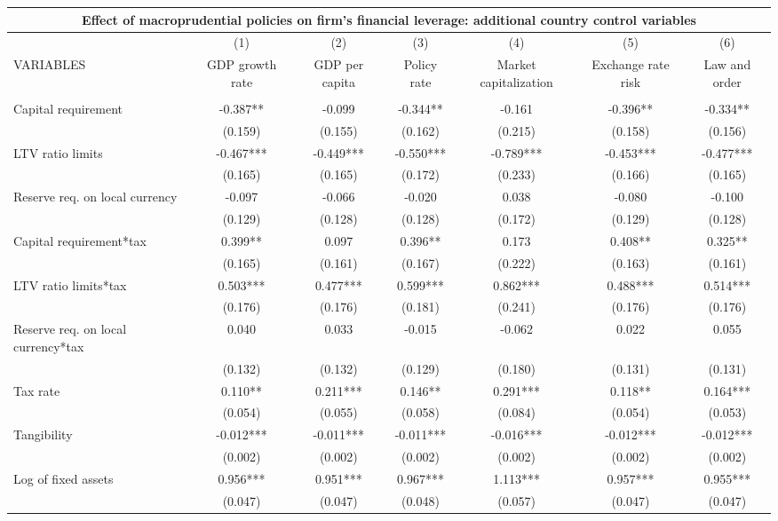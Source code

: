 \begin{tabular}{lcccccc}
\multicolumn{7}{c}{Effect of macroprudential policies on firm's financial leverage: additional country control variables} \\ \hline
 & (1) & (2) & (3) & (4) & (5) & (6) \\
VARIABLES & GDP growth rate & GDP per capita & Policy rate & Market capitalization & Exchange rate risk & Law and order \\ \hline
 &  &  &  &  &  &  \\
Capital requirement & -0.387** & -0.099 & -0.344** & -0.161 & -0.396** & -0.334** \\
 & (0.159) & (0.155) & (0.162) & (0.215) & (0.158) & (0.156) \\
LTV ratio limits & -0.467*** & -0.449*** & -0.550*** & -0.789*** & -0.453*** & -0.477*** \\
 & (0.165) & (0.165) & (0.172) & (0.233) & (0.166) & (0.165) \\
Reserve req. on local currency & -0.097 & -0.066 & -0.020 & 0.038 & -0.080 & -0.100 \\
 & (0.129) & (0.128) & (0.128) & (0.172) & (0.129) & (0.128) \\
Capital requirement*tax & 0.399** & 0.097 & 0.396** & 0.173 & 0.408** & 0.325** \\
 & (0.165) & (0.161) & (0.167) & (0.222) & (0.163) & (0.161) \\
LTV ratio limits*tax & 0.503*** & 0.477*** & 0.599*** & 0.862*** & 0.488*** & 0.514*** \\
 & (0.176) & (0.176) & (0.181) & (0.241) & (0.176) & (0.176) \\
Reserve req. on local currency*tax & 0.040 & 0.033 & -0.015 & -0.062 & 0.022 & 0.055 \\
 & (0.132) & (0.132) & (0.129) & (0.180) & (0.131) & (0.131) \\
Tax rate & 0.110** & 0.211*** & 0.146** & 0.291*** & 0.118** & 0.164*** \\
 & (0.054) & (0.055) & (0.058) & (0.084) & (0.054) & (0.053) \\
Tangibility & -0.012*** & -0.011*** & -0.011*** & -0.016*** & -0.012*** & -0.012*** \\
 & (0.002) & (0.002) & (0.002) & (0.002) & (0.002) & (0.002) \\
Log of fixed assets & 0.956*** & 0.951*** & 0.967*** & 1.113*** & 0.957*** & 0.955*** \\
 & (0.047) & (0.047) & (0.048) & (0.057) & (0.047) & (0.047) \\

\end{tabular}
